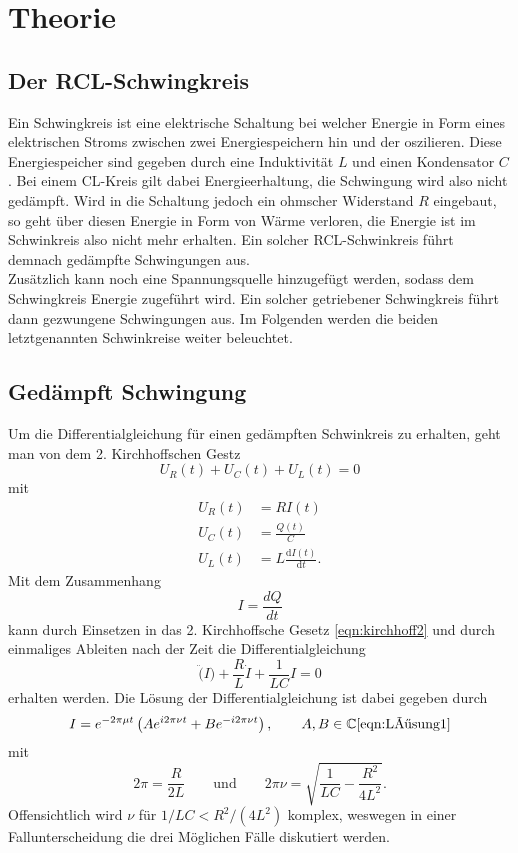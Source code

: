 \section{Theorie}
\label{sec:Theorie}
\subsection{Der RCL-Schwingkreis}
\label{sec:RCL}
Ein Schwingkreis ist eine elektrische Schaltung bei welcher Energie in Form eines elektrischen Stroms zwischen zwei Energiespeichern hin 
und der oszilieren. Diese Energiespeicher sind gegeben durch eine Induktivität $L$ und einen Kondensator $C$. Bei einem CL-Kreis gilt dabei
Energieerhaltung, die Schwingung wird also nicht gedämpft. Wird in die Schaltung jedoch ein ohmscher Widerstand $R$ eingebaut, so geht über 
diesen Energie in Form von Wärme verloren, die Energie ist im Schwinkreis also nicht mehr erhalten. Ein solcher RCL-Schwinkreis führt demnach
gedämpfte Schwingungen aus.\\\noindent
Zusätzlich kann noch eine Spannungsquelle hinzugefügt werden, sodass dem Schwingkreis Energie zugeführt wird. Ein solcher getriebener 
Schwingkreis führt dann gezwungene Schwingungen aus.
Im Folgenden werden die beiden letztgenannten Schwinkreise weiter beleuchtet.

\subsection{Gedämpft Schwingung}
\label{sec:gedämpft}
Um die Differentialgleichung für einen gedämpften Schwinkreis zu erhalten, geht man von dem 2. Kirchhoffschen Gestz
\begin{equation}
    U_R(t)+U_C(t)+U_L(t)=0
    \label{eqn:kirchhoff2}
\end{equation}
mit
\begin{align*}
U_R(t)&=RI(t)                           \\
U_C(t)&=\frac{Q(t)}{C}                  \\
U_L(t)&=L\frac{\text{d}I(t)}{\text{d}t}    .
\end{align*}
Mit dem Zusammenhang 
\begin{equation*}
    I=\frac{dQ}{dt}
\end{equation*}
kann durch Einsetzen in das 2. Kirchhoffsche Gesetz \eqref{eqn:kirchhoff2} und durch einmaliges Ableiten nach der Zeit
die Differentialgleichung
\begin{equation}
    \ddot(I)+\frac{R}{L}\dot{I}+\frac{1}{LC}I=0
    \label{eqn:DGL1}
\end{equation}
erhalten werden. Die Lösung der Differentialgleichung ist dabei gegeben durch
\begin{equation}
    I=e^{-2\pi\mu t}\left(Ae^{i2\pi\nu t}+Be^{-i2\pi\nu t}\right), \qquad A,B\in\mathbb{C}
    \ref{eqn:Lösung1}
\end{equation}
mit
\begin{equation*}
    2\pi=\frac{R}{2L} 
    \qquad\text{und}\qquad 
    2\pi \nu=\sqrt{\frac{1}{LC}-\frac{R^2}{4L^2}} .
\end{equation*}
Offensichtlich wird $\nu$ für $1/LC<R^2/(4L^2)$ komplex, weswegen in einer Fallunterscheidung die drei Möglichen Fälle 
diskutiert werden.
